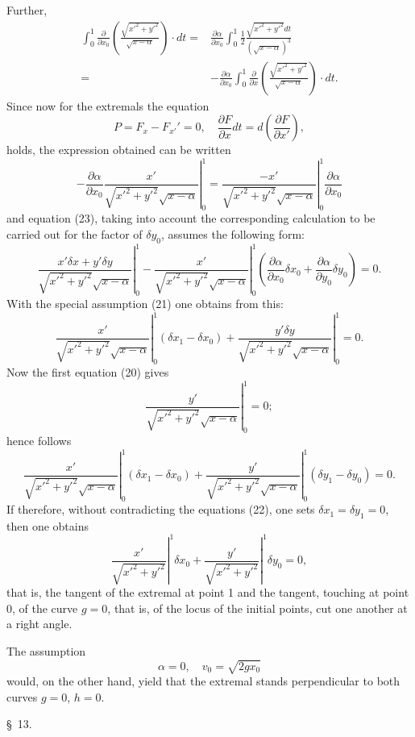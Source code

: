 \documentclass[11pt,a4paper,leqno]{article}
\begin{document}
Further,
\[
\begin{split}
\int_0^1\frac{\partial}{\partial x_0}\left(\frac{\sqrt{x'^2+y'^2}}{\sqrt{x-\alpha}}\right)\cdot dt
={}&\frac{\partial\alpha}{\partial x_0}\int_0^1\frac{1}{2}\frac{\sqrt{x'^2+y'^2}dt}{(\sqrt{x-\alpha})^3}\\
={}&-\frac{\partial\alpha}{\partial x_0}\int_0^1\frac{\partial}{\partial x}\left(\frac{\sqrt{x'^2+y'^2}}{\sqrt{x-\alpha}}\right)\cdot dt.
\end{split}
\]
Since now for the extremals the equation
\[
P=F_x-F_{x'}'=0,\quad \frac{\partial F}{\partial x}dt=d\left(\frac{\partial F}{\partial x'}\right),
\]
holds, the expression obtained can be written
\[
-\frac{\partial\alpha}{\partial x_0}\left.\frac{x'}{\sqrt{x'^2+y'^2}\sqrt{x-\alpha}}\right|_0^1
=\left.\frac{-x'}{\sqrt{x'^2+y'^2}\sqrt{x-\alpha}}\right|_0^1\frac{\partial\alpha}{\partial x_0}
\]
and equation (23), taking into account the corresponding calculation to be carried out for the factor of $\delta y_0$, assumes the following form:
\[
\left.\frac{x'\delta x+y'\delta y}{\sqrt{x'^2+y'^2}\sqrt{x-\alpha}}\right|_0^1
-\left.\frac{x'}{\sqrt{x'^2+y'^2}\sqrt{x-\alpha}}\right|_0^1\left(\frac{\partial\alpha}{\partial x_0}\delta x_0+\frac{\partial\alpha}{\partial y_0}\delta y_0\right)=0.
\]
With the special assumption (21) one obtains from this:
\[
\left.\frac{x'}{\sqrt{x'^2+y'^2}\sqrt{x-\alpha}}\right|_0^1(\delta x_1-\delta x_0)
+\left.\frac{y'\delta y}{\sqrt{x'^2+y'^2}\sqrt{x-\alpha}}\right|_0^1=0.
\]
Now the first equation (20) gives
\[
\left.\frac{y'}{\sqrt{x'^2+y'^2}\sqrt{x-\alpha}}\right|_0^1=0;
\]
hence follows
\[
\left.\frac{x'}{\sqrt{x'^2+y'^2}\sqrt{x-\alpha}}\right|_0^1(\delta x_1-\delta x_0)
+\left.\frac{y'}{\sqrt{x'^2+y'^2}\sqrt{x-\alpha}}\right|_0^1(\delta y_1-\delta y_0)=0.
\]
If therefore, without contradicting the equations (22), one sets $\delta x_1=\delta y_1=0$, then one obtains
\[
\left.\frac{x'}{\sqrt{x'^2+y'^2}}\right|^1\delta x_0+
\left.\frac{y'}{\sqrt{x'^2+y'^2}}\right|^1\delta y_0=0,
\]
that is, the tangent of the extremal at point 1 and the tangent, touching at point 0, of the curve $g=0$, that is, of the locus of the initial points, cut one another at a right angle.

The assumption
\[
\alpha=0,\quad v_0=\sqrt{2gx_0}
\]
would, on the other hand, yield that the extremal stands perpendicular to both curves $g=0$, $h=0$.

\begin{center}{\large \S~13.}\end{center}
\end{document}
